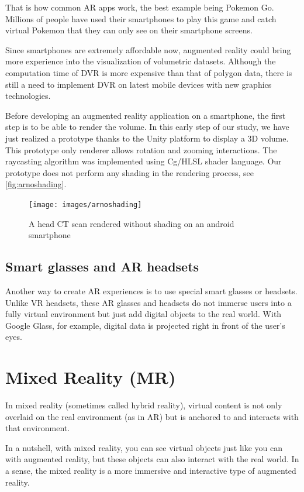 That is how common AR apps work, the best example being Pokemon Go. Millions of people have used their smartphones to play this game and catch virtual Pokemon that they can only see on their smartphone screens. 


Since smartphones are extremely affordable now, augmented reality could bring more experience into the visualization of volumetric datasets. Although the computation time
of DVR is more expensive than that of polygon data, there is
still a need to implement DVR on latest mobile devices with
new graphics technologies.


Before developing an augmented reality application on a smartphone, the first step is to be able to render the volume. In this early step of our study, we have just realized a prototype thanks to the Unity platform to display a 3D volume. This prototype only renderer allows rotation and zooming interactions. The raycasting algorithm was implemented using Cg/HLSL shader language. Our prototype does not perform any shading in the rendering process, see \autoref{fig:arnoshading}. 

\begin{figure}
\centering
\texttt{[image: images/arnoshading]}
\caption{A head CT scan rendered without shading on an android smartphone }
\label{fig:arnoshading}
\end{figure}

\subsection{Smart glasses and AR headsets}

Another way to create AR experiences is to use special smart glasses or headsets. Unlike VR headsets, these AR glasses and headsets do not immerse users into a fully virtual environment but just add digital objects to the real world. With Google Glass, for example, digital data is projected right in front of the user's eyes.

\section{ Mixed Reality (MR)}

In mixed reality (sometimes called hybrid reality), virtual content is not only overlaid on the real environment (as in AR) but is anchored to and interacts with that environment.

In a nutshell, with mixed reality, you can see virtual objects just like you can with augmented reality, but these objects can also interact with the real world. In a sense, the mixed reality is a more immersive and interactive type of augmented reality.

